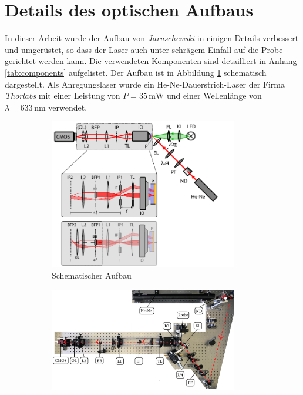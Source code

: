 \documentclass[a4paper, titlepage,  ngerman]{book}
\begin{document}
	\section{Details des optischen Aufbaus}
	In dieser Arbeit wurde der Aufbau von \textit{Jaruschewski} \cite{Jaruschewski.2020} in einigen Details verbessert und umgerüstet, so dass der Laser auch unter schrägem Einfall auf die Probe gerichtet werden kann. Die verwendeten Komponenten sind detailliert in Anhang \ref{tab:components} aufgelistet. Der Aufbau ist in Abbildung \ref{fig:aufbau_schema} schematisch dargestellt. Als Anregungslaser wurde ein He-Ne-Dauerstrich-Laser der Firma \textit{Thorlabs} mit einer Leistung von $P = 35 \,\mathrm{mW}$ und einer Wellenlänge von $\lambda = 633\,\mathrm{nm}$ verwendet.
	\begin{figure}
		\centering
		\begin{subfigure}{0.9\textwidth}		
			\centering
			\includegraphics[width=0.9\textwidth]{figures/Aufbau_Schema.pdf}
			\caption{Schematischer Aufbau}			
			\label{fig:aufbau_schema}
		\end{subfigure}
		\vfil
		\begin{subfigure}{0.9\textwidth} 
			\centering
			\includegraphics[width=0.9\textwidth]{figures/aufsicht_aufbau_anotated.jpg}

\end{subfigure}
\end{figure}
\end{document}
